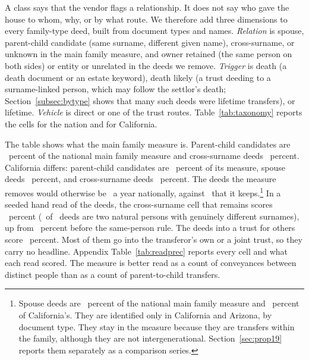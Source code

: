 A class says that the vendor flags a relationship. It does not say who gave the house to whom, why, or by what route. We therefore add three dimensions to every family-type deed, built from document types and names. \emph{Relation} is spouse, parent-child candidate (same surname, different given name), cross-surname, or unknown in the main family measure, and owner retained (the same person on both sides) or entity or unrelated in the deeds we remove. \emph{Trigger} is death (a death document or an estate keyword), death likely (a trust deeding to a surname-linked person, which may follow the settlor's death; Section~\ref{subsec:bytype} shows that many such deeds were lifetime transfers), or lifetime. \emph{Vehicle} is direct or one of the trust routes. Table~\ref{tab:taxonomy} reports the cells for the nation and for California.



The table shows what the main family measure is. Parent-child candidates are \SIIIParentChildShareNat\ percent of the national main family measure and cross-surname deeds \SIIICrossSurnameShareNat\ percent. California differs: parent-child candidates are \SIIIParentChildShareCA\ percent of its measure, spouse deeds \SIIISpouseShareCA\ percent, and cross-surname deeds \SIIICrossSurnameShareCA\ percent. The deeds the measure removes would otherwise be \SIIISamePEntityAvgNat\ a year nationally, against \SIIIMainAvgNat\ that it keeps.\footnote{Spouse deeds are \SIIISpouseShareNat\ percent of the national main family measure and \SIIISpouseShareCA\ percent of California's. They are identified only in California and Arizona, by document type. They stay in the measure because they are transfers within the family, although they are not intergenerational. Section~\ref{sec:prop19} reports them separately as a comparison series.} In a seeded hand read of the deeds, the cross-surname cell that remains scores \SIIIReadCrossSurname\ percent (\SIIIReadCrossSurnameCorrect\ of \SIIIReadCrossSurnameN\ deeds are two natural persons with genuinely different surnames), up from \SIIIReadCrossBefore\ percent before the same-person rule. The deeds into a trust for others score \SIIIReadIntoTrustOthers\ percent. Most of them go into the transferor's own or a joint trust, so they carry no headline. Appendix Table~\ref{tab:readprec} reports every cell and what each read scored. The measure is better read as a count of conveyances between distinct people than as a count of parent-to-child transfers.

